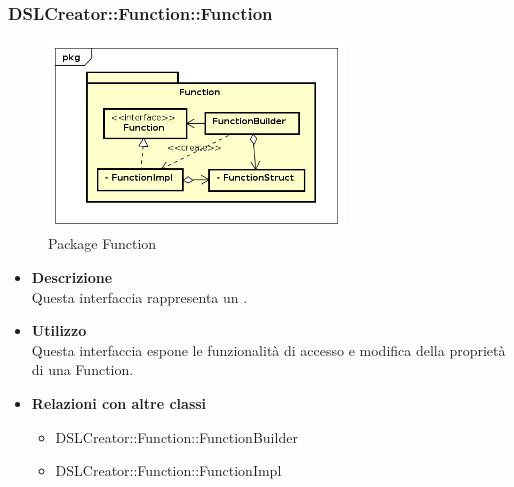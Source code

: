  \subsubsection{DSLCreator::Function::Function}
                 \begin{figure}[H]
                  \centering
                  \includegraphics[width=0.7\textwidth]{res/img/Function.png}
                  \caption{Package Function}
                  \label{fig:diagram_model}
                \end{figure}
                    \begin{itemize}
                        \item \textbf{Descrizione} \hfill \\
                          Questa interfaccia rappresenta un . 
                        \item \textbf{Utilizzo} \hfill \\
                          Questa interfaccia espone le funzionalità di accesso e modifica della proprietà di una Function.
                        \item \textbf{Relazioni con altre classi}
                            \begin{itemize}
                              \item DSLCreator::Function::FunctionBuilder
                              \item DSLCreator::Function::FunctionImpl
                            \end{itemize}
                    \end{itemize}  

